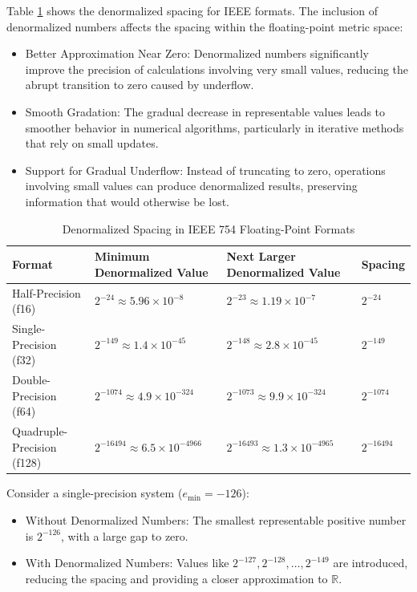 Table \ref{tab:denormalized_spacing} shows the denormalized spacing for IEEE formats. The inclusion of denormalized numbers affects the spacing within the floating-point metric space:
\begin{itemize}
    \item Better Approximation Near Zero: Denormalized numbers significantly improve the precision of calculations involving very small values, reducing the abrupt transition to zero caused by underflow.
    \item Smooth Gradation: The gradual decrease in representable values leads to smoother behavior in numerical algorithms, particularly in iterative methods that rely on small updates.
    \item Support for Gradual Underflow: Instead of truncating to zero, operations involving small values can produce denormalized results, preserving information that would otherwise be lost.
\end{itemize}

\begin{table}[h!]
\centering
\renewcommand{\arraystretch}{1.3} %
\setlength{\tabcolsep}{6pt} %
\caption{Denormalized Spacing in IEEE 754 Floating-Point Formats}
\label{tab:denormalized_spacing}
\begin{tabular}{|p{3.5cm}|p{4cm}|p{4cm}|p{1.5cm}|}
\hline
\textbf{Format}          & \textbf{Minimum Denormalized Value} & \textbf{Next Larger Denormalized Value} & \textbf{Spacing} \\ \hline
Half-Precision (f16)     & \( 2^{-24} \approx 5.96 \times 10^{-8} \) & \( 2^{-23} \approx 1.19 \times 10^{-7} \) & \( 2^{-24} \) \\ \hline
Single-Precision (f32)   & \( 2^{-149} \approx 1.4 \times 10^{-45} \) & \( 2^{-148} \approx 2.8 \times 10^{-45} \) & \( 2^{-149} \) \\ \hline
Double-Precision (f64)   & \( 2^{-1074} \approx 4.9 \times 10^{-324} \) & \( 2^{-1073} \approx 9.9 \times 10^{-324} \) & \( 2^{-1074} \) \\ \hline
Quadruple-Precision (f128) & \( 2^{-16494} \approx 6.5 \times 10^{-4966} \) & \( 2^{-16493} \approx 1.3 \times 10^{-4965} \) & \( 2^{-16494} \) \\ \hline
\end{tabular}
\end{table}


Consider a single-precision system (\( e_{\text{min}} = -126 \)):
\begin{itemize}[noitemsep]
    \item Without Denormalized Numbers: The smallest representable positive number is \( 2^{-126} \), with a large gap to zero.
    \item With Denormalized Numbers: Values like \( 2^{-127}, 2^{-128}, \dots, 2^{-149} \) are introduced, reducing the spacing and providing a closer approximation to \( \mathbb{R} \).
\end{itemize}


